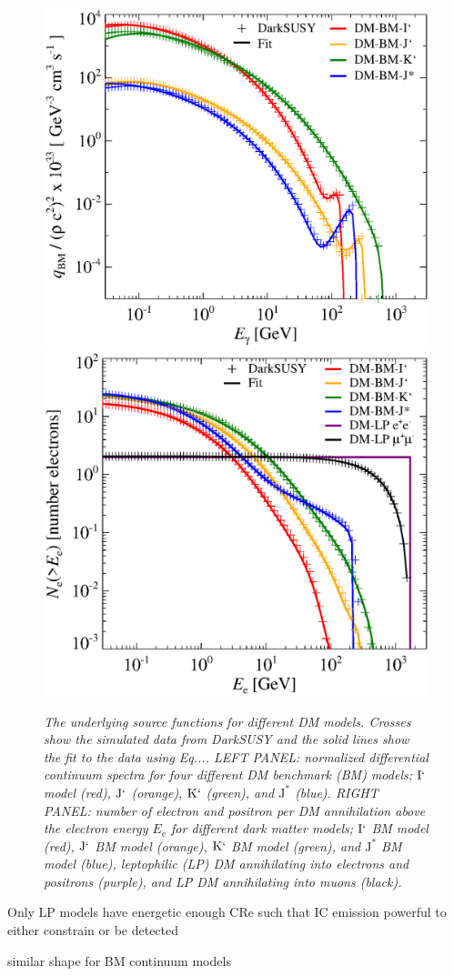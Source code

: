 \documentclass[10pt,aps,pra,reprint,amsmath,amsfonts,amssymb,showpacs]{revtex4-1}
\newcommand{\rmn}{\mathrm}
\newcommand{\ee}{E_\rmn{e}}
\newcommand{\Kp}{\rmn{K}`}
\newcommand{\Ip}{\rmn{I}`}
\newcommand{\Js}{\rmn{J}^*}
\newcommand{\Jp}{\rmn{J}`}
\begin{document}
\clearpage
\appendix

\begin{figure}
\begin{minipage}{2.0\columnwidth}
 \includegraphics[width=0.49\columnwidth]{figures/fit.ds.flux.eps}
 \includegraphics[width=0.49\columnwidth]{figures/fit.epflux.int.eps}
\caption{\it The underlying source functions for different DM
  models. Crosses show the simulated data from DarkSUSY and the solid
  lines show the fit to the data using Eq.... LEFT PANEL: normalized
  differential continuum spectra for four different DM benchmark (BM)
  models; $\Ip$ model (red), $\Jp$ (orange), $\Kp$ (green), and
  $\Js$ (blue). RIGHT PANEL: number of electron and positron per DM
  annihilation above the electron energy $\ee$ for different dark
  matter models; $\Ip$ BM model (red), $\Jp$ BM model (orange),
  $\Kp$ BM model (green), and $\Js$ BM model (blue), leptophilic (LP)
  DM annihilating into electrons and positrons (purple), and LP DM
  annihilating into muons (black).}
 \label{fig:q_DM}
\end{minipage}
\end{figure}
Only LP models have energetic enough CRe such that IC emission
powerful to either constrain or be detected

similar shape for BM continuum models
\end{document}
